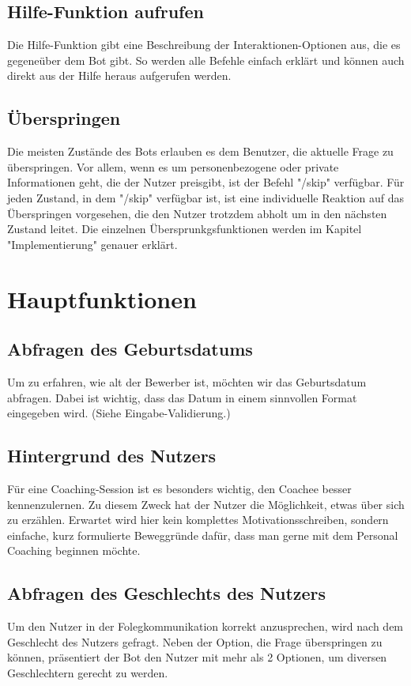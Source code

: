         \subsection{Hilfe-Funktion aufrufen}
            Die Hilfe-Funktion gibt eine Beschreibung der Interaktionen-Optionen aus, die es gegeneüber dem Bot gibt. So werden alle Befehle einfach erklärt und können auch direkt aus der Hilfe heraus aufgerufen werden. 

        \subsection{Überspringen}
            Die meisten Zustände des Bots erlauben es dem Benutzer, die aktuelle Frage zu überspringen. Vor allem, wenn es um personenbezogene oder private Informationen geht, die der Nutzer preisgibt, ist der Befehl "/skip" verfügbar. Für jeden Zustand, in dem "/skip" verfügbar ist, ist eine individuelle Reaktion auf das Überspringen vorgesehen, die den Nutzer trotzdem abholt um in den nächsten Zustand leitet. Die einzelnen Übersprunkgsfunktionen werden im Kapitel "Implementierung" genauer erklärt.

    \section{Hauptfunktionen}

        \subsection{Abfragen des Geburtsdatums}    
            Um zu erfahren, wie alt der Bewerber ist, möchten wir das Geburtsdatum abfragen. Dabei ist wichtig, dass das Datum in einem sinnvollen Format eingegeben wird. (Siehe Eingabe-Validierung.)

        \subsection{Hintergrund des Nutzers}
            Für eine Coaching-Session ist es besonders wichtig, den Coachee besser kennenzulernen. Zu diesem Zweck hat der Nutzer die Möglichkeit, etwas über sich zu erzählen. Erwartet wird hier kein komplettes Motivationsschreiben, sondern einfache, kurz formulierte Beweggründe dafür, dass man gerne mit dem Personal Coaching beginnen möchte. 
        
        \subsection{Abfragen des Geschlechts des Nutzers}
            Um den Nutzer in der Folegkommunikation korrekt anzusprechen, wird nach dem Geschlecht des Nutzers gefragt. Neben der Option, die Frage überspringen zu können, präsentiert der Bot den Nutzer mit mehr als 2 Optionen, um diversen Geschlechtern gerecht zu werden.
        
